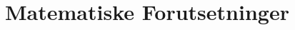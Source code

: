 \documentclass[../main.tex]{subfiles}
\begin{document}
\chapter{Matematiske Forutsetninger}\label{chap:preliminaries}






\end{document}
